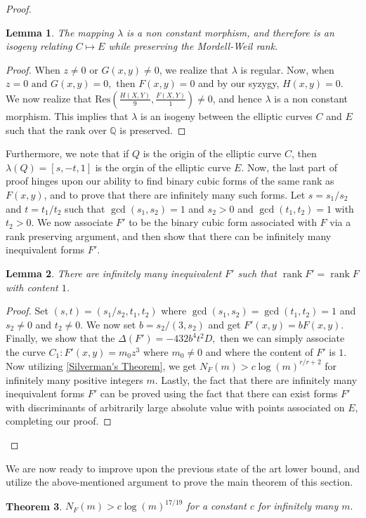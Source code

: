 \documentclass[12pt]{amsart}
\renewcommand{\qedsymbol}{$\blacksquare$}
\theoremstyle{plain}
\newtheorem{thm}{Theorem}
\newtheorem{lemma}[thm]{Lemma}
\theoremstyle{definition}
\theoremstyle{remark}
\numberwithin{equation}{section}
\numberwithin{thm}{section}
\theoremstyle{named}
\theoremstyle{named}
\begin{document}
\begin{proof}
\begin{lemma}
    The mapping $\lambda$ is a non constant morphism, and therefore is an isogeny relating $C \mapsto E$ while preserving the Mordell-Weil rank. 
\end{lemma}
\begin{proof}
    When $z \neq 0 \text{ or } G(x,y) \neq 0$, we realize that $\lambda$ is regular. Now, when $z = 0 \text{ and } G(x,y) = 0,$  then $F(x,y) =0 $ and by our syzygy, $H(x,y) = 0$. We now realize that $\mathrm{Res}( \frac{H(X, Y)}{9}, \frac{F(X,Y)}{1}) \neq 0$, and hence $\lambda$ is a non constant morphism. This implies that $\lambda$ is an isogeny between the elliptic curves $C$ and $E$ such that the rank over $\mathbb{Q}$ is preserved. 
    \end{proof}
Furthermore, we note that if $Q$ is the origin of the elliptic curve $C$, then $\lambda(Q) = [s, -t, 1]$ is the orgin of the elliptic curve $E$. Now, the last part of proof hinges upon our ability to find binary cubic forms of the same rank as $F(x,y)$, and to prove that there are infinitely many such forms. Let $s = s_1/s_2$ and $t = t_1/t_2$ such that $\gcd(s_1,s_2) = 1$ and $s_2 > 0$ and $\gcd(t_1, t_2) = 1$ with $t_2 > 0$. We now associate $F'$ to be the binary cubic form associated with $F$ via a rank preserving argument, and then show that there can be infinitely many inequivalent forms $F'$. 
\begin{lemma}
    There are infinitely many inequivalent $F'$ such that $\operatorname{rank}F' = \operatorname{rank}F$ with content $1$.
\end{lemma}
\begin{proof}\renewcommand{\qedsymbol}{}

Set $(s,t) = (s_1/s_2, t_1,t_2)$ where $\gcd(s_1,s_2) = \gcd(t_1,t_2) = 1$ and $s_2 \neq 0$ and $t_2 \neq 0.$ We now set $b = s_2/(3,s_2)$ and get $F'(x,y) = b F(x,y).$ Finally, we show that the $\Delta(F') = -432b^4 t^2D, $ then we can simply associate the curve $C_1: F'(x,y) = m_0 z^3$ where $m_0 \neq 0$ and where the content of $F'$ is $1.$ Now utilizing \ref{Silverman's Theorem}, we get $N_{F} (m) > c \log(m)^{r/r+2}$ for infinitely many positive integers $m.$ Lastly, the fact that there are infinitely many inequivalent forms $F'$ can be proved using the fact that there can exist forms $F'$ with discriminants of arbitrarily large absolute value with points associated on $E$, completing our proof.
\end{proof}
\end{proof}
We are now ready to improve upon the previous state of the art lower bound, and utilize the above-mentioned argument to prove the main theorem of this section. 
\begin{thm}
    $N_{F}(m) > c \log{(m)}^{17/19}$ for a constant $c$ for infinitely many $m.$
\end{thm}
\end{document}
